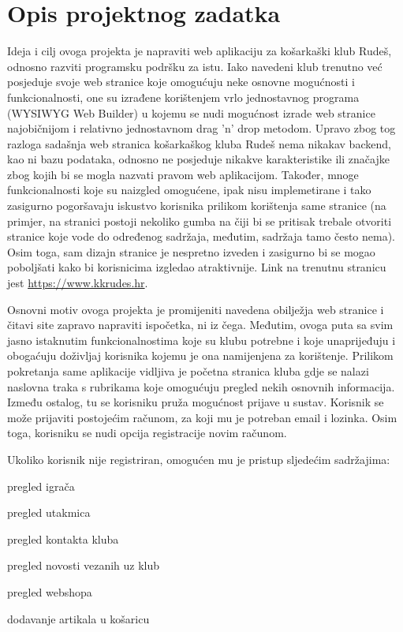 \chapter{Opis projektnog zadatka}


\textnormal{Ideja i cilj ovoga projekta je napraviti web aplikaciju za košarkaški klub Rudeš, odnosno razviti programsku podršku za istu.
	Iako navedeni klub trenutno već posjeduje svoje web stranice koje omogućuju neke osnovne mogućnosti i funkcionalnosti, one su
	izrađene korištenjem vrlo jednostavnog programa (WYSIWYG Web Builder) u kojemu se nudi mogućnost izrade web stranice najobičnijom 
	i relativno jednostavnom drag 'n' drop metodom. Upravo zbog tog razloga sadašnja web stranica košarkaškog kluba Rudeš nema nikakav
	backend, kao ni bazu podataka, odnosno ne posjeduje nikakve karakteristike ili značajke zbog kojih bi se mogla nazvati pravom web 
	aplikacijom. Također, mnoge funkcionalnosti koje su naizgled omogućene, ipak nisu implemetirane i tako zasigurno pogoršavaju iskustvo 
	korisnika prilikom korištenja same stranice (na primjer, na stranici postoji nekoliko gumba na čiji bi se pritisak trebale otvoriti 
	stranice koje vode do određenog sadržaja, međutim, sadržaja tamo često nema). Osim toga, sam dizajn stranice je nespretno izveden i 
	zasigurno bi se mogao poboljšati kako bi korisnicima izgledao atraktivnije. Link na trenutnu stranicu jest \url{https://www.kkrudes.hr}.
}

\bigbreak

\textnormal{Osnovni motiv ovoga projekta je promijeniti navedena obilježja web stranice i čitavi site zapravo napraviti ispočetka, ni iz čega.
	Međutim, ovoga puta sa svim jasno istaknutim funkcionalnostima koje su klubu potrebne i koje unaprijeđuju i obogaćuju doživljaj
	korisnika kojemu je ona namijenjena za korištenje.
	Prilikom pokretanja same aplikacije vidljiva je početna stranica kluba gdje se nalazi naslovna traka s rubrikama koje omogućuju 
	pregled nekih osnovnih informacija. Između ostalog, tu se korisniku pruža mogućnost prijave u sustav. Korisnik se može prijaviti 
	postojećim računom, za koji mu je potreban email i lozinka. Osim toga, korisniku se nudi opcija registracije novim računom.}

\pagebreak

\textnormal{Ukoliko korisnik nije registriran, omogućen mu je pristup sljedećim sadržajima:}
\begin{packed_item}
	\item pregled igrača
	\item pregled utakmica
	\item pregled kontakta kluba
	\item pregled novosti vezanih uz klub
	\item pregled webshopa
	\item dodavanje artikala u košaricu
\end{packed_item}

